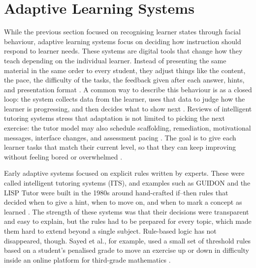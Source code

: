 
\section{Adaptive Learning Systems}\label{sec:adaptive_learning_systems}

While the previous section focused on recognising learner states through facial behaviour, adaptive learning systems focus on deciding how instruction should respond to learner needs. These systems are digital tools that change how they teach depending on the individual learner. Instead of presenting the same material in the same order to every student, they adjust things like the content, the pace, the difficulty of the tasks, the feedback given after each answer, hints, and presentation format \cite{strielkowski_span_2025}. A common way to describe this behaviour is as a closed loop: the system collects data from the learner, uses that data to judge how the learner is progressing, and then decides what to show next \cite{gligorea_adaptive_2023}. Reviews of intelligent tutoring systems stress that adaptation is not limited to picking the next exercise: the tutor model may also schedule scaffolding, remediation, motivational messages, interface changes, and assessment pacing \cite{zerkouk_comprehensive_2025}. The goal is to give each learner tasks that match their current level, so that they can keep improving without feeling bored or overwhelmed \cite{zerkouk_comprehensive_2025}.

Early adaptive systems focused on explicit rules written by experts. These were called intelligent tutoring systems (ITS), and examples such as GUIDON and the LISP Tutor were built in the 1980s around hand-crafted if--then rules that decided when to give a hint, when to move on, and when to mark a concept as learned \cite{zerkouk_comprehensive_2025}. The strength of these systems was that their decisions were transparent and easy to explain, but the rules had to be prepared for every topic, which made them hard to extend beyond a single subject. Rule-based logic has not disappeared, though. Sayed et al., for example, used a small set of threshold rules based on a student's penalised grade to move an exercise up or down in difficulty inside an online platform for third-grade mathematics \cite{sayed_ai-based_2023}.

